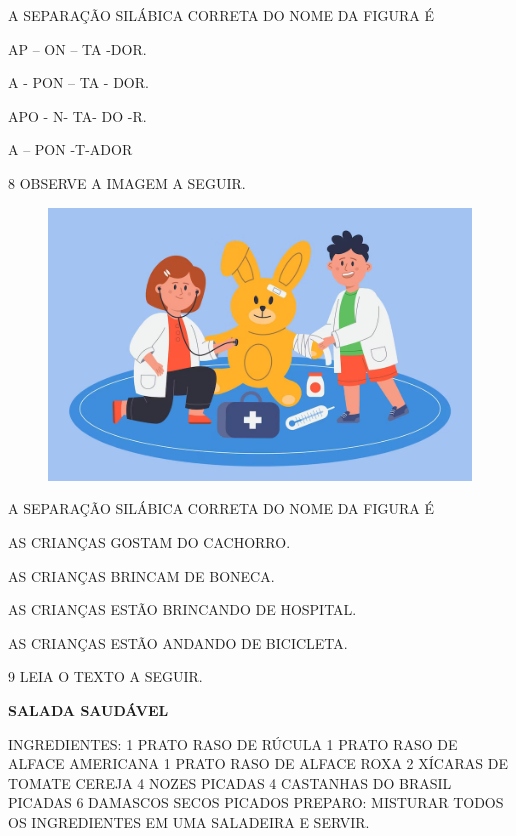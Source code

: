 A SEPARAÇÃO SILÁBICA CORRETA DO NOME DA FIGURA É

\begin{escolha}

\item AP – ON – TA -DOR.

\item A - PON – TA - DOR.

\item APO - N- TA- DO -R.

\item A – PON -T-ADOR

\end{escolha}

\num{8} OBSERVE A IMAGEM A SEGUIR.

\begin{figure}[H]
\centering
\includegraphics[width=.7\textwidth]{./media/image234.png}
\end{figure}

A SEPARAÇÃO SILÁBICA CORRETA DO NOME DA FIGURA É

\begin{escolha}

\item AS CRIANÇAS GOSTAM DO CACHORRO.

\item AS CRIANÇAS BRINCAM DE BONECA.

\item AS CRIANÇAS ESTÃO BRINCANDO DE HOSPITAL.

\item AS CRIANÇAS ESTÃO ANDANDO DE BICICLETA.

\end{escolha}

\num{9} LEIA O TEXTO A SEGUIR.

\begin{myquote}
\textbf{SALADA SAUDÁVEL}

INGREDIENTES:
1 PRATO RASO DE RÚCULA
1 PRATO RASO DE ALFACE AMERICANA 
1 PRATO RASO DE ALFACE ROXA
2 XÍCARAS DE TOMATE CEREJA
4 NOZES PICADAS
4 CASTANHAS DO BRASIL PICADAS 
6 DAMASCOS SECOS PICADOS
PREPARO:
MISTURAR TODOS OS INGREDIENTES EM UMA SALADEIRA E SERVIR.

\end{myquote}

